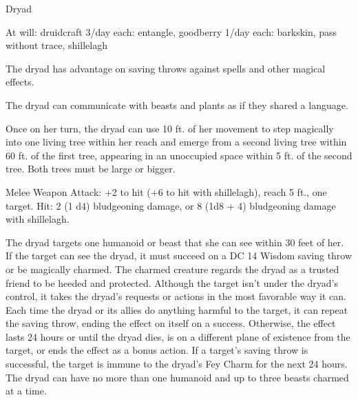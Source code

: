 \begin{monsterbox}{Dryad}
\begin{monsteraction}
At will: druidcraft
3/day each: entangle, goodberry
1/day each: barkskin, pass without trace, shillelagh
\end{monsteraction}
\begin{monsteraction}
The dryad has advantage on saving throws against spells and other magical effects.
\end{monsteraction}
\begin{monsteraction}
The dryad can communicate with beasts and plants as if they shared a language.
\end{monsteraction}
\begin{monsteraction}
Once on her turn, the dryad can use 10 ft. of her movement to step magically into one living tree within her reach and emerge from a second living tree within 60 ft. of the first tree, appearing in an unoccupied space within 5 ft. of the second tree. Both trees must be large or bigger.
\end{monsteraction}
\begin{monsteraction}[Club]
Melee Weapon Attack: +2 to hit (+6 to hit with shillelagh), reach 5 ft., one target. Hit: 2 (1 d4) bludgeoning damage, or 8 (1d8 + 4) bludgeoning damage with shillelagh.
\end{monsteraction}
\begin{monsteraction}
The dryad targets one humanoid or beast that she can see within 30 feet of her. If the target can see the dryad, it must succeed on a DC 14 Wisdom saving throw or be magically charmed. The charmed creature regards the dryad as a trusted friend to be heeded and protected. Although the target isn't under the dryad's control, it takes the dryad's requests or actions in the most favorable way it can.
Each time the dryad or its allies do anything harmful to the target, it can repeat the saving throw, ending the effect on itself on a success. Otherwise, the effect lasts 24 hours or until the dryad dies, is on a different plane of existence from the target, or ends the effect as a bonus action. If a target's saving throw is successful, the target is immune to the dryad's Fey Charm for the next 24 hours.
The dryad can have no more than one humanoid and up to three beasts charmed at a time.
\end{monsteraction}
\end{monsterbox}
